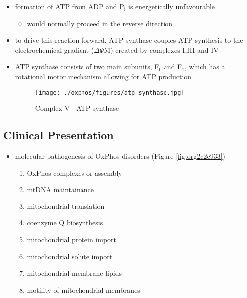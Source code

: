 \documentclass{scrartcl}
\begin{document}
\begin{enumerate}
{\small{}}

\begin{itemize}
\item formation of ATP from ADP and P\(_{\text{i}}\) is energetically unfavourable
\begin{itemize}
\item would normally proceed in the reverse direction
\end{itemize}

\item to drive this reaction forward, ATP synthase couples ATP synthesis
to the electrochemical gradient (\(\Delta \Psi\)M) created by complexes
I,III and IV

\item ATP synthase consists of two main subunits, F\(_{\text{0}}\) and F\(_{\text{1}}\), which has a
rotational motor mechanism allowing for ATP production

\begin{figure}[htbp]
\centering
\texttt{[image: ./oxphos/figures/atp\_synthase.jpg]}
\caption{\label{fig:org16db207}
Complex V | ATP synthase}
\end{figure}
\end{itemize}
\end{enumerate}

\subsection{Clinical Presentation}
\label{sec:org236efd3}
\begin{itemize}
\item molecular pathogenesis of OxPhos disorders (Figure \ref{fig:org2c2c933})
\begin{enumerate}
\item OxPhos complexes or assembly
\item mtDNA maintainance
\item mitochondrial translation
\item coenzyme Q biosynthesis
\item mitochondrial protein import
\item mitochondrial solute import
\item mitochondrial membrane lipids
\item motility of mitochondrial membranes
\end{enumerate}
\end{itemize}
\end{document}
